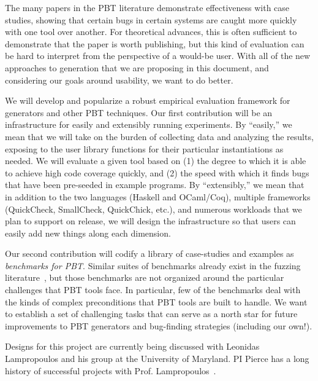 
%
\iflater{}\fi
\iflater{}\fi
%
The many papers in the PBT literature demonstrate effectiveness with case
studies, showing that certain bugs in certain systems are caught more quickly
with one tool over another. For theoretical advances, this is often sufficient
to demonstrate that the paper is worth publishing, but this kind of evaluation
can be hard to interpret from the perspective of a would-be user. With all of
the new approaches to generation that we are proposing in this document, and
considering our goals around usability, we want to do better.

We will develop and popularize a robust empirical evaluation framework for
generators and other PBT techniques. Our first contribution will be an
infrastructure for easily and extensibly running experiments.  By ``easily,'' we
mean that we will take on the burden of collecting data and analyzing the
results, exposing to the user library functions for their particular
instantiations as needed. We will evaluate a given tool based on (1) the degree
to which it is able to achieve high code coverage quickly, and (2) the speed
with which it finds bugs that have been pre-seeded in example programs. By
``extensibly,'' we mean that in addition to the two languages (Haskell and
OCaml/Coq), multiple frameworks (QuickCheck, SmallCheck, QuickChick, etc.), and
numerous workloads that we plan to support on release, we will design the
infrastructure so that users can easily add new things along each dimension.

Our second contribution will codify a library of case-studies and examples as
{\em benchmarks for PBT}. Similar suites of benchmarks already exist in the
fuzzing literature~\cite{hazimeh_magma_2021}, but those benchmarks are not
organized around the particular challenges that PBT tools face. In particular,
few of the benchmarks deal with the kinds of complex preconditions that PBT
tools are built to handle. We want to establish a set of challenging tasks that
can serve as a north star for future improvements to PBT generators and
bug-finding strategies (including our own!).

Designs for this project are currently being discussed with Leonidas
Lampropoulos and his group at the University of Maryland. PI Pierce has a long
history of successful projects with Prof.
Lampropoulos~\cite[etc.]{LuckPOPL,goldstein2021dojudgeatest,lampropoulos_coverage_2019,Lampropoulos&18,OLDlampropoulos19fuzzchick}.

